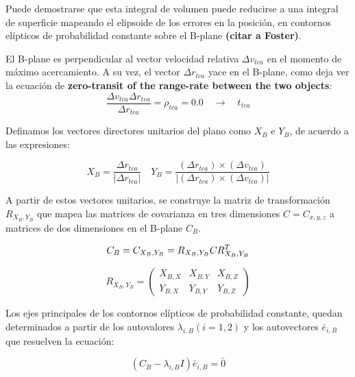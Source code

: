 Puede demostrarse que esta integral de volumen puede reducirse a una integral de superficie mapeando el elipsoide  de los errores en la posici\'on, en contornos el\'ipticos de probabilidad constante sobre el B-plane {\bf{(citar a Foster)}}.

El B-plane es perpendicular al vector velocidad relativa $\Delta v_{tca}$ en el momento de m\'aximo acercamiento.
A su vez, el vector $\Delta r_{tca}$ yace en el B-plane, como deja ver la ecuaci\'on de {\bf{zero-transit of the range-rate between the two objects}}:
\begin{equation}
\frac{\Delta v_{tca} \Delta r_{tca}}{\Delta r_{tca}}= \dot{\rho}_{tca}=0.0 \quad \rightarrow \quad t_{tca}
\end{equation}

Definamos los vectores directores unitarios del plano como $X_{B}$ e $Y_{B}$, de acuerdo a las expresiones:

\begin{equation}
X_{B}=\frac{\Delta r_{tca}}{|\Delta r_{tca}|} \quad Y_{B}=\frac{(\Delta r_{tca}) \times (\Delta v_{tca})}{|(\Delta r_{tca}) \times (\Delta v_{tca})|}
\end{equation}


A partir de estos vectores unitarios, se construye la matriz de transformaci\'on $R_{X_{B},Y_{B}}$ que mapea las matrices de covarianza en tres dimensiones $C=C_{x,y,z}$ a matrices de dos dimensiones en el B-plane $C_{B}$.

\begin{equation}
C_{B} = C_{{X_{B},Y_{B}}} = R_{X_{B},Y_{B}} C R^{T}_{X_{B},Y_{B}}\\
\end{equation}

\begin{equation}
R_{X_{B},Y_{B}} =
\begin{pmatrix}
X_{B,X} & X_{B,Y} & X_{B,Z}\\
Y_{B,X} & Y_{B,Y} & Y_{B,Z}
\end{pmatrix}
\end{equation}

Los ejes principales de los contornos el\'ipticos de probabilidad constante, quedan determinados a partir de los autovalores $\lambda_{i,B}(i=1,2)$ y los autovectores $\bar{e}_{i,B}$ que resuelven la ecuaci\'on:

\begin{equation}
(C_{B} - \lambda_{i,B} I) \bar{e}_{i,B} = \bar{0}
\end{equation}

